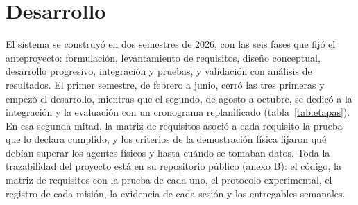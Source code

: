 \chapter{Desarrollo}
\label{cap:desarrollo}

El sistema se construyó en dos semestres de 2026, con las seis fases que fijó el anteproyecto: formulación,
levantamiento de requisitos, diseño conceptual, desarrollo progresivo, integración y pruebas, y validación con
análisis de resultados. El primer semestre, de febrero a junio, cerró las tres primeras y empezó el desarrollo,
mientras que el segundo, de agosto a octubre, se dedicó a la integración y la evaluación con un cronograma
replanificado (tabla~\ref{tab:etapas}). En esa segunda mitad, la matriz de requisitos asoció a cada requisito la
prueba que lo declara cumplido, y los criterios de la demostración física fijaron qué debían superar los agentes
físicos y hasta cuándo se tomaban datos. Toda la trazabilidad del proyecto está en su repositorio público (anexo B):
el código, la matriz de requisitos con la prueba de cada uno, el protocolo experimental, el registro de cada misión,
la evidencia de cada sesión y los entregables semanales.

